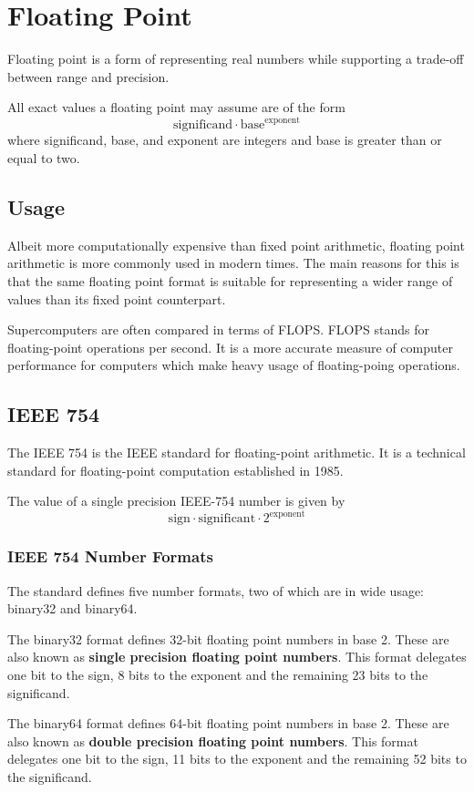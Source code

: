 \documentclass[oneside]{book} %
\theoremstyle{plain}
\begin{document}
\section{Floating Point}
Floating point is a form of representing real numbers while supporting a
trade-off between range and precision.

All exact values a floating point may assume are of the form
\[\text{significand} \cdot \text{base}^\text{exponent}\]
where significand, base, and exponent are integers and base is greater than or
equal to two.

\subsection{Usage}
Albeit more computationally expensive than fixed point arithmetic, floating
point arithmetic is more commonly used in modern times. The main reasons for
this is that the same floating point format is suitable for representing a wider
range of values than its fixed point counterpart.

Supercomputers are often compared in terms of FLOPS. FLOPS stands for
floating-point operations per second. It is a more accurate measure of computer
performance for computers which make heavy usage of floating-poing
operations.

\subsection{IEEE 754}
The IEEE 754 is the IEEE standard for floating-point arithmetic. It is a
technical standard for floating-point computation established in 1985.

The value of a single precision IEEE-754 number is given by
\[\text{sign} \cdot \text{significant} \cdot 2^\text{exponent}\]

\subsubsection{IEEE 754 Number Formats}
The standard defines five number formats, two of which are in wide usage:
binary32 and binary64.

The binary32 format defines 32-bit floating point numbers in base 2. These are
also known as \textbf{single precision floating point numbers}. This format
delegates one bit to the sign, 8 bits to the exponent and the remaining 23 bits
to the significand.

The binary64 format defines 64-bit floating point numbers in base 2. These are
also known as \textbf{double precision floating point numbers}. This format
delegates one bit to the sign, 11 bits to the exponent and the remaining 52 bits
to the significand.
\end{document}
